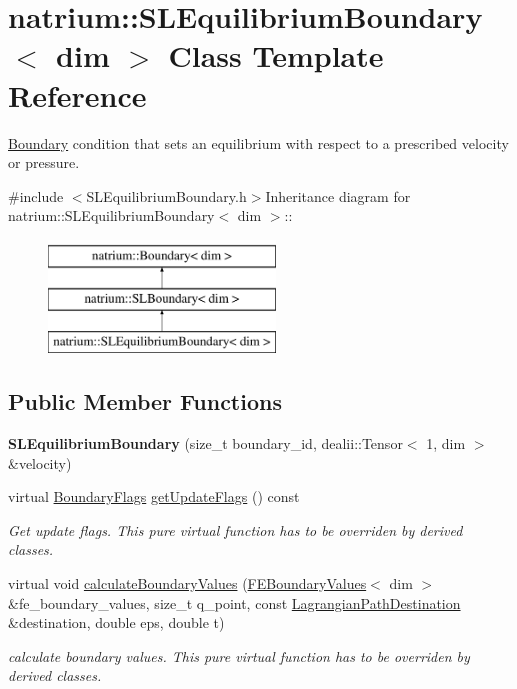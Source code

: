 \hypertarget{classnatrium_1_1SLEquilibriumBoundary}{
\section{natrium::SLEquilibriumBoundary$<$ dim $>$ Class Template Reference}
\label{classnatrium_1_1SLEquilibriumBoundary}
}


\hyperlink{classnatrium_1_1Boundary}{Boundary} condition that sets an equilibrium with respect to a prescribed velocity or pressure.  


{\ttfamily \#include $<$SLEquilibriumBoundary.h$>$}Inheritance diagram for natrium::SLEquilibriumBoundary$<$ dim $>$::\begin{figure}[H]
\begin{center}
\leavevmode
\includegraphics[height=3cm]{classnatrium_1_1SLEquilibriumBoundary}
\end{center}
\end{figure}
\subsection*{Public Member Functions}
\begin{DoxyCompactItemize}
\item 
\hypertarget{classnatrium_1_1SLEquilibriumBoundary_abd99d0bc8bb8c15aedb8dbef803b38df}{
{\bfseries SLEquilibriumBoundary} (size\_\-t boundary\_\-id, dealii::Tensor$<$ 1, dim $>$ \&velocity)}
\label{classnatrium_1_1SLEquilibriumBoundary_abd99d0bc8bb8c15aedb8dbef803b38df}

\item 
virtual \hyperlink{namespacenatrium_a93b2a3d564675413b9f6cc88c60f46af}{BoundaryFlags} \hyperlink{classnatrium_1_1SLEquilibriumBoundary_a09e349b179448c54a68245485be642f0}{getUpdateFlags} () const 
\begin{DoxyCompactList}\small\item\em Get update flags. This pure virtual function has to be overriden by derived classes. \item\end{DoxyCompactList}\item 
virtual void \hyperlink{classnatrium_1_1SLEquilibriumBoundary_a25ba9ab8c3263043b158e913d130bd2d}{calculateBoundaryValues} (\hyperlink{classnatrium_1_1FEBoundaryValues}{FEBoundaryValues}$<$ dim $>$ \&fe\_\-boundary\_\-values, size\_\-t q\_\-point, const \hyperlink{structnatrium_1_1LagrangianPathDestination}{LagrangianPathDestination} \&destination, double eps, double t)
\begin{DoxyCompactList}\small\item\em calculate boundary values. This pure virtual function has to be overriden by derived classes. \item\end{DoxyCompactList}\end{DoxyCompactItemize}


